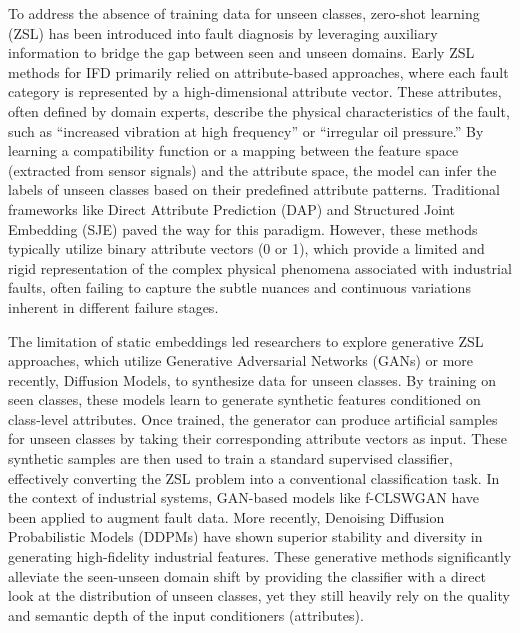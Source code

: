 \documentclass[journal,12pt,onecolumn]{IEEEtran}
\begin{document}
To address the absence of training data for unseen classes, zero-shot learning (ZSL) has been introduced into fault diagnosis by leveraging auxiliary information to bridge the gap between seen and unseen domains. Early ZSL methods for IFD primarily relied on attribute-based approaches, where each fault category is represented by a high-dimensional attribute vector. These attributes, often defined by domain experts, describe the physical characteristics of the fault, such as ``increased vibration at high frequency'' or ``irregular oil pressure.'' By learning a compatibility function or a mapping between the feature space (extracted from sensor signals) and the attribute space, the model can infer the labels of unseen classes based on their predefined attribute patterns. Traditional frameworks like Direct Attribute Prediction (DAP) and Structured Joint Embedding (SJE) paved the way for this paradigm. However, these methods typically utilize binary attribute vectors (0 or 1), which provide a limited and rigid representation of the complex physical phenomena associated with industrial faults, often failing to capture the subtle nuances and continuous variations inherent in different failure stages.

The limitation of static embeddings led researchers to explore generative ZSL approaches, which utilize Generative Adversarial Networks (GANs) or more recently, Diffusion Models, to synthesize data for unseen classes. By training on seen classes, these models learn to generate synthetic features conditioned on class-level attributes. Once trained, the generator can produce artificial samples for unseen classes by taking their corresponding attribute vectors as input. These synthetic samples are then used to train a standard supervised classifier, effectively converting the ZSL problem into a conventional classification task. In the context of industrial systems, GAN-based models like f-CLSWGAN have been applied to augment fault data. More recently, Denoising Diffusion Probabilistic Models (DDPMs) have shown superior stability and diversity in generating high-fidelity industrial features. These generative methods significantly alleviate the seen-unseen domain shift by providing the classifier with a direct look at the distribution of unseen classes, yet they still heavily rely on the quality and semantic depth of the input conditioners (attributes).
\end{document}
